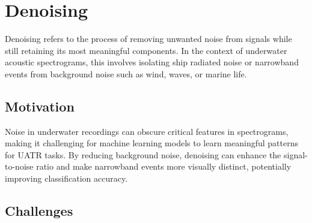 




\section{Denoising}

Denoising refers to the process of removing unwanted noise from signals while still retaining its most meaningful components. In the context of underwater acoustic spectrograms, this involves isolating ship radiated noise or narrowband events from background noise such as wind, waves, or marine life.

\subsection{Motivation}

Noise in underwater recordings can obscure critical features in spectrograms, making it challenging for machine learning models to learn meaningful patterns for UATR tasks. By reducing background noise, denoising can enhance the signal-to-noise ratio and make narrowband events more visually distinct, potentially improving classification accuracy.

\subsection{Challenges}

